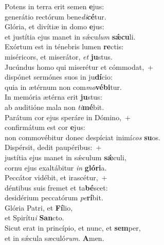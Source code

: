 \evenverse Potens in terra erit semen \textbf{e}jus:~\*\\
\evenverse generátio rectórum bene\textit{di}\textbf{cé}tur.\\
\oddverse Glória, et divítiæ in domo \textbf{e}jus:~\*\\
\oddverse et justítia ejus manet in sǽcu\textit{lum} \textbf{sǽ}\textbf{cu}li.\\
\evenverse Exórtum est in ténebris lumen \textbf{re}ctis:~\*\\
\evenverse miséricors, et miserátor, \textit{et} \textbf{ju}stus.\\
\oddverse Jucúndus homo qui miserétur et cómmodat,~+\\
\oddverse  dispónet sermónes suos in ju\textbf{dí}cio:~\*\\
\oddverse quia in ætérnum non com\textit{mo}\textbf{vé}\textbf{bi}tur.\\
\evenverse In memória ætérna erit \textbf{ju}stus:~\*\\
\evenverse ab auditióne mala non \textit{ti}\textbf{mé}bit.\\
\oddverse Parátum cor ejus speráre in Dómino,~+\\
\oddverse  confirmátum est cor \textbf{e}jus:~\*\\
\oddverse non commovébitur donec despíciat inimí\textit{cos} \textbf{su}os.\\
\evenverse Dispérsit, dedit paupéribus:~+\\
\evenverse  justítia ejus manet in sǽculum \textbf{sǽ}culi,~\*\\
\evenverse cornu ejus exaltábitur \textit{in} \textbf{gló}\textbf{ri}a.\\
\oddverse Peccátor vidébit, et irascétur,~+\\
\oddverse  déntibus suis fremet et ta\textbf{bé}scet:~\*\\
\oddverse desidérium peccatórum \textit{pe}\textbf{rí}bit.\\
\evenverse Glória Patri, et \textbf{Fí}lio,~\*\\
\evenverse et Spirítu\textit{i} \textbf{San}cto.\\
\oddverse Sicut erat in princípio, et nunc, et \textbf{sem}per,~\*\\
\oddverse et in sǽcula sæculó\textit{rum}. \textbf{A}men.\\
